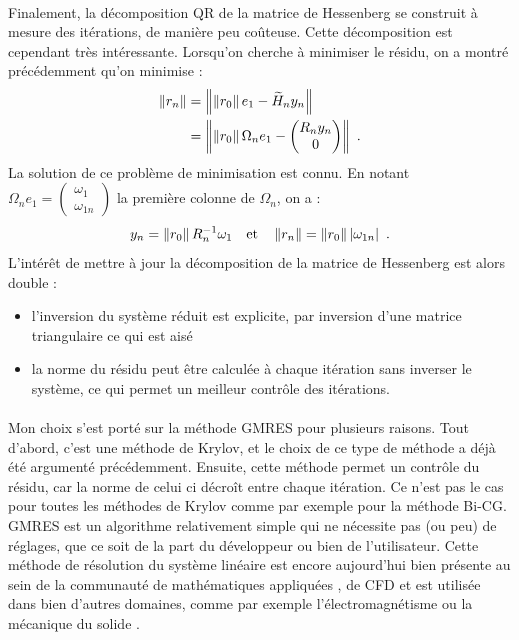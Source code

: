 		\paragraph{}
		Finalement, la décomposition QR de la matrice de Hessenberg se construit à mesure des itérations, de manière peu coûteuse.
		Cette décomposition est cependant très intéressante.
		Lorsqu'on cherche à minimiser le résidu, on a montré précédemment qu'on minimise :
		\begin{align*}
			\norm{r_n} &= \norm{\norm{r_0} e_1 - \widetilde{H}_ny_n} \\
			&= \norm{\norm{r_0} \Omega_ne_1 - \begin{pmatrix}R_ny_n \\ 0\end{pmatrix}}\ .
		\end{align*}
		La solution de ce problème de minimisation est connu.
		En notant $\Omega_ne_1 = \begin{pmatrix}\omega_1 \\ \omega_{1n}\end{pmatrix}$ la première colonne de $\Omega_n$, on a :
		\[y_n = \norm{r_0}R_n^{-1}\omega_1\quad\textrm{et}\quad\norm{r_n} = \norm{r_0}\left|\omega_{1n}\right|\ .\]
		L'intérêt de mettre à jour la décomposition de la matrice de Hessenberg est alors double :
		\begin{itemize}
			\item l'inversion du système réduit est explicite, par inversion d'une matrice triangulaire ce qui est aisé
			\item la norme du résidu peut être calculée à chaque itération sans inverser le système, ce qui permet un meilleur contrôle des itérations.
		\end{itemize}

		\paragraph{}
		Mon choix s'est porté sur la méthode GMRES pour plusieurs raisons.
		Tout d'abord, c'est une méthode de Krylov, et le choix de ce type de méthode a déjà été argumenté précédemment.
		Ensuite, cette méthode permet un contrôle du résidu, car la norme de celui ci décroît entre chaque itération.
		Ce n'est pas le cas pour toutes les méthodes de Krylov comme par exemple pour la méthode Bi-CG.
		GMRES est un algorithme relativement simple qui ne nécessite pas (ou peu) de réglages, que ce soit de la part du développeur ou bien de l'utilisateur.
		Cette méthode de résolution du système linéaire est encore aujourd'hui bien présente au sein de la communauté de mathématiques appliquées \cite{Vasseur2016}, de CFD \cite{FrancoCamierAndrejEtAl2020} et est utilisée dans bien d'autres domaines, comme par exemple l'électromagnétisme \cite{ErnstGander2012} ou la mécanique du solide \cite{Mercier2015}.


